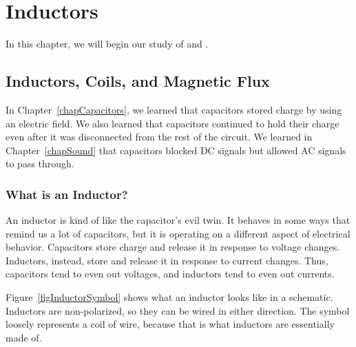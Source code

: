 \chapter{Inductors}
\label{chapInductors}


In this chapter, we will begin our study of  and .

\section{Inductors, Coils, and Magnetic Flux}

In Chapter~\ref{chapCapacitors}, we learned that capacitors stored charge by using an electric field.
We also learned that capacitors continued to hold their charge even after it was disconnected from the rest of the circuit.
We learned in Chapter~\ref{chapSound} that capacitors blocked DC signals but allowed AC signals to pass through.

\subsection{What is an Inductor?}
An inductor is kind of like the capacitor's evil twin.  
It behaves in some ways that remind us a lot of capacitors, but it is operating on a different aspect of electrical behavior.
Capacitors store charge and release it in response to voltage changes.
Inductors, instead, store  and release it in response to current changes.
Thus, capacitors tend to even out voltages, and inductors tend to even out currents.


Figure~\ref{figInductorSymbol} shows what an inductor looks like in a schematic.
Inductors are non-polarized, so they can be wired in either direction.
The symbol loosely represents a coil of wire, because that is what inductors are essentially made of.


